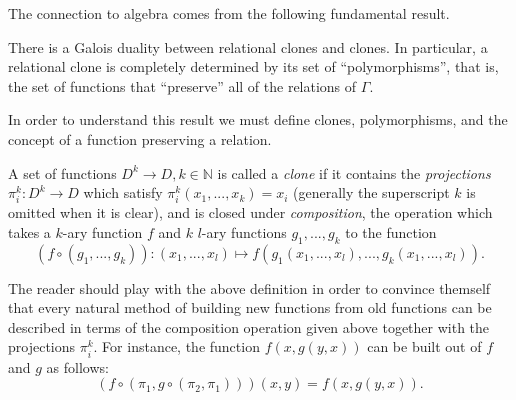 The connection to algebra comes from the following fundamental result.

\begin{thm} There is a Galois duality between relational clones and clones. In particular, a relational clone is completely determined by its set of ``polymorphisms'', that is, the set of functions that ``preserve'' all of the relations of $\Gamma$.
\end{thm}

In order to understand this result we must define clones, polymorphisms, and the concept of a function preserving a relation.

\begin{defn} A set of functions $D^k \rightarrow D, k \in \mathbb{N}$ is called a \emph{clone} if it contains the \emph{projections} $\pi_i^k : D^k \rightarrow D$ which satisfy $\pi_i^k(x_1, ..., x_k) = x_i$ (generally the superscript $k$ is omitted when it is clear), and is closed under \emph{composition}, the operation which takes a $k$-ary function $f$ and $k$ $l$-ary functions $g_1, ..., g_k$ to the function
\[
(f\circ (g_1, ..., g_k)) : (x_1, ..., x_{l}) \mapsto f(g_1(x_1, ..., x_l), ..., g_k(x_{1}, ..., x_{l})).
\]
\end{defn}

The reader should play with the above definition in order to convince themself that every natural method of building new functions from old functions can be described in terms of the composition operation given above together with the projections $\pi_i^k$. For instance, the function $f(x,g(y,x))$ can be built out of $f$ and $g$ as follows:
\[
(f\circ (\pi_1, g\circ (\pi_2, \pi_1)))(x,y) = f(x,g(y,x)).
\]

